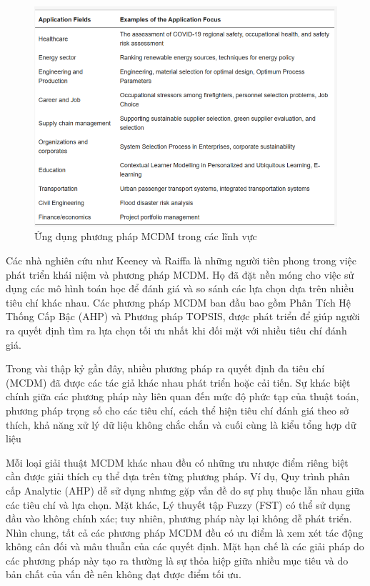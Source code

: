 \begin{figure}[H]
    \centering
    \includegraphics[width=0.8\linewidth, height=0.3\textheight]{images/MCDM.png}
    \vspace{0.6cm}
    \caption{Ứng dụng phương pháp MCDM trong các lĩnh vực}
\end{figure}


Các nhà nghiên cứu như Keeney và Raiffa là những người tiên phong trong việc phát triển khái niệm và phương pháp MCDM. Họ đã đặt nền móng cho việc sử dụng các mô hình toán học để đánh giá và so sánh các lựa chọn dựa trên nhiều tiêu chí khác nhau. Các phương pháp MCDM ban đầu bao gồm Phân Tích Hệ Thống Cấp Bậc (AHP) và Phương pháp TOPSIS, được phát triển để giúp người ra quyết định tìm ra lựa chọn tối ưu nhất khi đối mặt với nhiều tiêu chí đánh giá. \cite{thutucphapluat}

Trong vài thập kỷ gần đây, nhiều phương pháp ra quyết định đa tiêu chí (MCDM) đã được các tác giả khác nhau phát triển hoặc cải tiến. Sự khác biệt chính giữa các phương pháp này liên quan đến mức độ phức tạp của thuật toán, phương pháp trọng số cho các tiêu chí, cách thể hiện tiêu chí đánh giá theo sở thích, khả năng xử lý dữ liệu không chắc chắn và cuối cùng là kiểu tổng hợp dữ liệu 

Mỗi loại giải thuật MCDM khác nhau đều có những ưu nhược điểm riêng biệt cần được giải thích cụ thể dựa trên từng phương pháp. Ví dụ, Quy trình phân cấp Analytic (AHP) dễ sử dụng nhưng gặp vấn đề do sự phụ thuộc lẫn nhau giữa các tiêu chí và lựa chọn. Mặt khác, Lý thuyết tập Fuzzy (FST) có thể sử dụng đầu vào không chính xác; tuy nhiên, phương pháp này lại không dễ phát triển. Nhìn chung, tất cả các phương pháp MCDM đều có ưu điểm là xem xét tác động không cân đối và mâu thuẫn của các quyết định. Mặt hạn chế là các giải pháp do các phương pháp này tạo ra thường là sự thỏa hiệp giữa nhiều mục tiêu và do bản chất của vấn đề nên không đạt được điểm tối ưu. 

